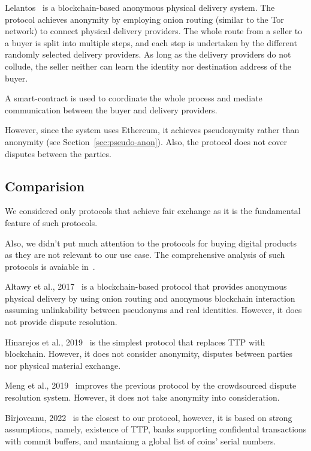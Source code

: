 Lelantos~\cite{altawyLelantosBlockchainBasedAnonymous2017} is a blockchain-based anonymous
physical delivery system. The protocol achieves anonymity by employing onion routing (similar to the Tor network) to connect physical delivery providers. The whole route from a seller to a buyer is split into multiple steps, and each step is undertaken by the different randomly selected delivery providers. As long as the delivery providers do not collude, the seller neither can learn the identity nor destination address of the buyer.

A smart-contract is used to coordinate the whole process and mediate communication between the buyer and delivery providers.

However, since the system uses Ethereum, it achieves pseudonymity rather than anonymity (see Section~\ref{sec:pseudo-anon}). Also, the protocol does not cover disputes between the parties.

\subsection{Comparision}

We considered only protocols that achieve fair exchange as it is the fundamental feature of such protocols.

Also, we didn't put much attention to the protocols for buying digital products as they are not relevant to our use case. The comprehensive analysis of such protocols is avaiable in~\cite{birjoveanuTwoPartyECommerceProtocols2022}.

Altawy et al., 2017~\cite{altawyLelantosBlockchainBasedAnonymous2017} is a blockchain-based protocol that provides anonymous physical delivery by using onion routing and anonymous blockchain interaction assuming unlinkability between pseudonyms and real identities. However, it does not provide dispute resolution.

Hinarejos et al., 2019~\cite{hinarejosSolutionSecureCertified2019} is the simplest protocol that replaces TTP with blockchain. However, it does not consider anonymity, disputes between parties nor physical material exchange.

Meng et al., 2019~\cite{mengThemisDecentralizedEscrow2019} improves the previous protocol by the crowdsourced dispute resolution system. However, it does not take anonymity into consideration.

Bîrjoveanu, 2022~\cite{birjoveanuTwoPartyECommerceProtocols2022} is the closest to our protocol, however, it is based on strong assumptions, namely, existence of TTP, banks supporting confidental transactions with commit buffers, and mantainng a global list of coins' serial numbers.

